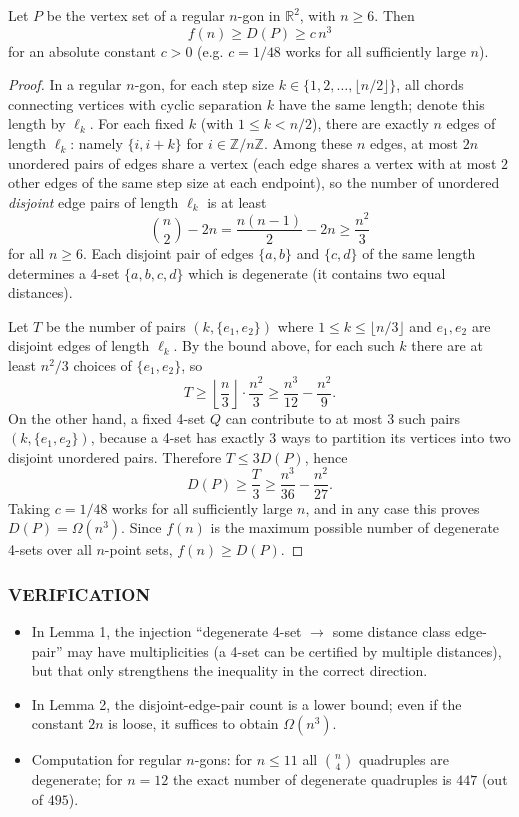\begin{lemma}
Let \(P\) be the vertex set of a regular \(n\)-gon in \(\mathbb{R}^2\), with \(n\ge 6\). Then
\[
 f(n)\ge D(P)\ge c\,n^3
\]
for an absolute constant \(c>0\) (e.g. \(c=1/48\) works for all sufficiently large \(n\)).
\end{lemma}

\begin{proof}
In a regular \(n\)-gon, for each step size \(k\in\{1,2,\dots,\lfloor n/2\rfloor\}\), all chords connecting vertices with cyclic separation \(k\) have the same length; denote this length by \(\ell_k\).
For each fixed \(k\) (with \(1\le k< n/2\)), there are exactly \(n\) edges of length \(\ell_k\): namely \(\{i,i+k\}\) for \(i\in\mathbb{Z}/n\mathbb{Z}\).
Among these \(n\) edges, at most \(2n\) unordered pairs of edges share a vertex (each edge shares a vertex with at most \(2\) other edges of the same step size at each endpoint), so the number of unordered \emph{disjoint} edge pairs of length \(\ell_k\) is at least
\[
\binom{n}{2}-2n = \frac{n(n-1)}{2}-2n \ge \frac{n^2}{3}
\]
for all \(n\ge 6\).
Each disjoint pair of edges \(\{a,b\}\) and \(\{c,d\}\) of the same length determines a 4-set \(\{a,b,c,d\}\) which is degenerate (it contains two equal distances).

Let \(T\) be the number of pairs \((k,\{e_1,e_2\})\) where \(1\le k\le \lfloor n/3\rfloor\) and \(e_1,e_2\) are disjoint edges of length \(\ell_k\).
By the bound above, for each such \(k\) there are at least \(n^2/3\) choices of \(\{e_1,e_2\}\), so
\[
T \ge \left\lfloor\frac{n}{3}\right\rfloor\cdot \frac{n^2}{3} \ge \frac{n^3}{12}-\frac{n^2}{9}.
\]
On the other hand, a fixed 4-set \(Q\) can contribute to at most \(3\) such pairs \((k,\{e_1,e_2\})\), because a 4-set has exactly \(3\) ways to partition its vertices into two disjoint unordered pairs.
Therefore \(T\le 3D(P)\), hence
\[
D(P)\ge \frac{T}{3} \ge \frac{n^3}{36}-\frac{n^2}{27}.
\]
Taking \(c=1/48\) works for all sufficiently large \(n\), and in any case this proves \(D(P)=\Omega(n^3)\).
Since \(f(n)\) is the maximum possible number of degenerate 4-sets over all \(n\)-point sets, \(f(n)\ge D(P)\).
\end{proof}

\subsubsection*{VERIFICATION}
\begin{itemize}
\item In Lemma 1, the injection ``degenerate 4-set \(\to\) some distance class edge-pair'' may have multiplicities (a 4-set can be certified by multiple distances), but that only strengthens the inequality in the correct direction.
\item In Lemma 2, the disjoint-edge-pair count is a lower bound; even if the constant \(2n\) is loose, it suffices to obtain \(\Omega(n^3)\).
\item Computation for regular \(n\)-gons: for \(n\le 11\) all \(\binom{n}{4}\) quadruples are degenerate; for \(n=12\) the exact number of degenerate quadruples is \(447\) (out of \(495\)).
\end{itemize}

